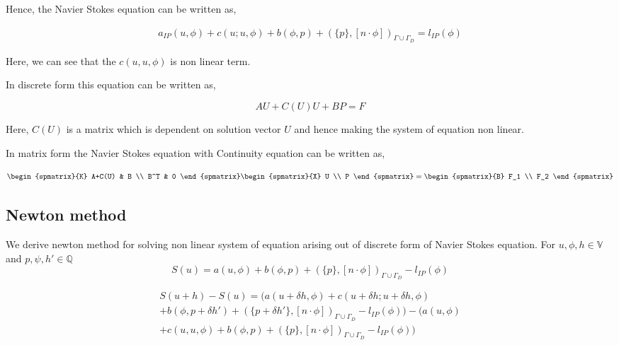 \documentclass[a4paper,12pt]{book}
\begin{document}
Hence, the Navier Stokes equation can be written as,

\begin{equation}\label{navier_stokes_weak}
\begin{split}
a_{IP}(u,\phi) + c(u;u,\phi) + b(\phi,p) + (\{p\},[n\cdot \phi])_{\Gamma \cup \Gamma_D} = l_{IP}(\phi) 
\end{split}
\end{equation}

Here, we can see that the $c(u,u,\phi)$ is non linear term.

In discrete form this equation can be written as,

\begin{equation}
AU + C(U) U + BP = F
\end{equation} 

Here, $C(U)$ is a matrix which is dependent on solution vector $U$ and hence making the system of equation non linear.

In matrix form the Navier Stokes equation with Continuity equation can be written as,

\begin{equation} \label{Stokes_matrix}
\begin{spmatrix}{K}
    A+C(U) & B \\
    B^T & 0
\end{spmatrix}
\begin{spmatrix}{X}
    U \\
    P
\end{spmatrix}
=
\begin{spmatrix}{B}
    F_1  \\
    F_2
\end{spmatrix}
\end{equation}

\subsection{Newton method} \cite{Haasdonk} \label{newton_method}

We derive newton method for solving non linear system of equation arising out of discrete form of Navier Stokes equation. For $u, \phi , h \in \mathbb{V}$ and $p, \psi , h' \in \mathbb{Q}$ \\
\begin{equation}
S(u) = a(u,\phi) + b(\phi,p) + (\{p\},[n\cdot \phi])_{\Gamma \cup \Gamma_D} - l_{IP}(\phi)
\end{equation}


\begin{equation}
\begin{split}
S(u+h) - S(u) = (a(u+\delta h,\phi) + c(u + \delta h;u + \delta h,\phi)\\ + b(\phi,p+\delta h') + (\{p+\delta h'\},[n\cdot \phi])_{\Gamma \cup \Gamma_D} - l_{IP}(\phi)) - (a(u,\phi)\\ + c(u,u,\phi) + b(\phi,p) + (\{p\},[n\cdot \phi])_{\Gamma \cup \Gamma_D} - l_{IP}(\phi))
\end{split}
\end{equation}
\end{document}
